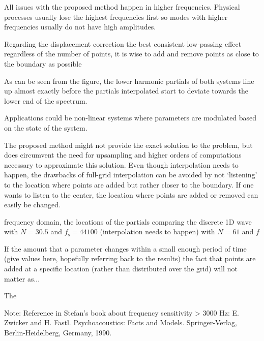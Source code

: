 All issues with the proposed method happen in higher frequencies. Physical processes usually lose the highest frequencies first so modes with higher frequencies usually do not have high amplitudes.

Regarding the displacement correction the best consistent low-passing effect regardless of the number of points, it is wise to add and remove points as close to the boundary as possible

As can be seen from the figure, the lower harmonic partials of both systems line up almost exactly before the partials interpolated start to deviate towards the lower end of the spectrum.


Applications could be non-linear systems where parameters are modulated based on the state of the system. 

The proposed method might not provide the exact solution to the problem, but does circumvent the need for upsampling and higher orders of computations necessary to approximate this solution. Even though interpolation needs to happen, the drawbacks of full-grid interpolation can be avoided by not `listening' to the location where points are added but rather closer to the boundary. If one wants to listen to the center, the location where points are added or removed can easily be changed.


frequency domain, the locations of the partials comparing the discrete 1D wave with $N = 30.5$ and $f_\text{s} = 44100$ (interpolation needs to happen) with $N = 61$ and $f$ 

If the amount that a parameter changes within a small enough period of time (give values here, hopefully referring back to the results) the fact that points are added at a specific location (rather than distributed over the grid) will not matter as... 

The 


Note: Reference in Stefan's book about frequency sensitivity > 3000 Hz: E. Zwicker and H. Fastl. Psychoacoustics: Facts and Models. Springer-Verlag, Berlin-Heidelberg,
Germany, 1990.
